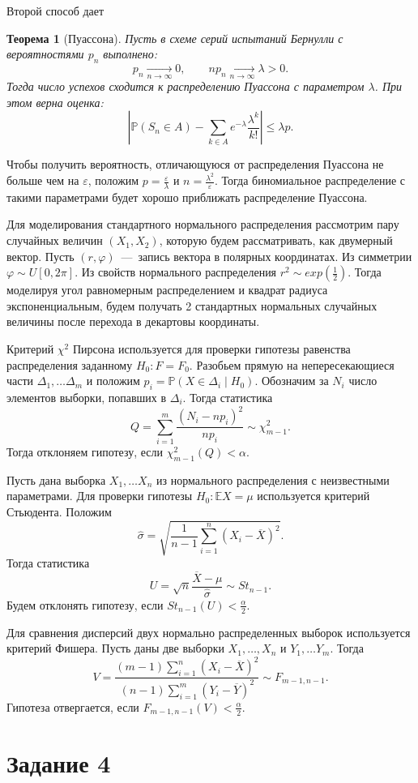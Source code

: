 \documentclass[12pt, a4paper]{article} %
\newtheorem{Th}{Теорема}
\renewcommand{\le}{\leqslant}
\renewcommand{\phi}{\varphi}
\renewcommand{\epsilon}{\varepsilon}
\def\Pro{\mathbb{P}} %
\def\Expec{\mathbb{E}} %
\begin{document}
Второй способ дает 
\begin{Th}[Пуассона]
    Пусть в схеме серий испытаний Бернулли с вероятностями $p_n$ выполнено:
     \[
        p_n \xrightarrow[n \rightarrow\infty]{} 0,\qquad 
        np_n \xrightarrow[n \rightarrow \infty]{} \lambda > 0.
    \]
    Тогда число успехов сходится к распределению Пуассона с параметром $\lambda$.
    При этом верна оценка:
     \[
         \left\lvert \Pro(S_n \in A) - \sum\limits_{k \in A} e^{-\lambda} \frac{\lambda^{k}}{k!}  \right\rvert \le \lambda p.
    \] 
\end{Th}
Чтобы получить вероятность, отличающуюся от распределения Пуассона не больше чем на $\epsilon$,
положим  $p = \frac{\epsilon}{\lambda}$ и $n = \frac{\lambda^2}{\epsilon}$. 
Тогда биномиальное распределение с такими параметрами будет хорошо приближать распределение Пуассона.

Для моделирования стандартного нормального распределения рассмотрим пару случайных величин $(X_1, X_2)$,
которую будем рассматривать, как двумерный вектор.
Пусть  $(r, \phi)$~---~запись вектора в полярных координатах.
Из симметрии $\phi \sim U[0, 2\pi]$.
Из свойств нормального распределения  $r^2 \sim exp(\frac{1}{2})$.
Тогда моделируя угол равномерным распределением и квадрат радиуса экспоненциальным, 
будем получать 2 стандартных нормальных случайных величины после перехода в декартовы координаты.

Критерий $\chi^2$ Пирсона используется для проверки гипотезы равенства распределения заданному $H_0\colon F = F_0$. 
Разобьем прямую на непересекающиеся части $\Delta_1,\ldots \Delta_m$ и
положим $p_i = \Pro(X \in \Delta_i \mid H_0)$.
Обозначим за $N_i$ число элементов выборки, попавших в $\Delta_i$.
Тогда статистика 
 \[
     Q = \sum\limits_{i=1}^{m} \frac{(N_i - np_i)^2}{np_i}
     \sim \chi^2_{m-1}.
\] 
Тогда отклоняем гипотезу, если $\chi^2_{m-1}(Q) < \alpha$.

Пусть дана выборка $X_1,\ldots X_n$ из нормального распределения с неизвестными параметрами.
Для проверки гипотезы $H_0\colon \Expec X = \mu$ используется критерий Стьюдента. 
Положим 
\[
    \hat{\sigma} = \sqrt{\frac{1}{n - 1} \sum\limits_{i=1}^{n} \left( X_i - \overline{X} \right)^2}.
\] 
Тогда статистика 
\[
    U = \sqrt{n} \frac{\overline{X} - \mu}{\hat{\sigma}}
    \sim St_{n-1}.
\] 
Будем отклонять гипотезу, если $St_{n-1}(U) < \frac{\alpha}{2}$.

Для сравнения дисперсий двух нормально распределенных выборок используется критерий Фишера.
Пусть даны две выборки $X_1,\ldots ,X_n$ и  $Y_1,\ldots Y_m$. 
Тогда 
\[
    V = \frac{(m-1)\sum\limits_{i=1}^{n} (X_i - \overline{X})^2}{(n-1)\sum\limits_{i=1}^{m} (Y_i - \overline{Y})^2}
    \sim F_{m-1, n-1}.
\] 
Гипотеза отвергается, если $F_{m-1,n-1}(V) < \frac{\alpha}{2}$.

\section*{Задание 4}



\newpage



 
\end{document}
